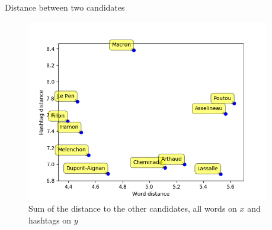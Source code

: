 \documentclass{beamer}
\begin{document}
\begin{frame}{Distance between two candidates}
\begin{figure}

\begin{columns}
\begin{column}{.8\textwidth}
\includegraphics[width=\textwidth]{distances.png}
\end{column}

\begin{column}{.3\textwidth}
\caption{Sum of the distance to the other candidates, all words on $x$ and hashtags on $y$}
\end{column}
\end{columns}

\end{figure}
\end{frame}
\end{document}
